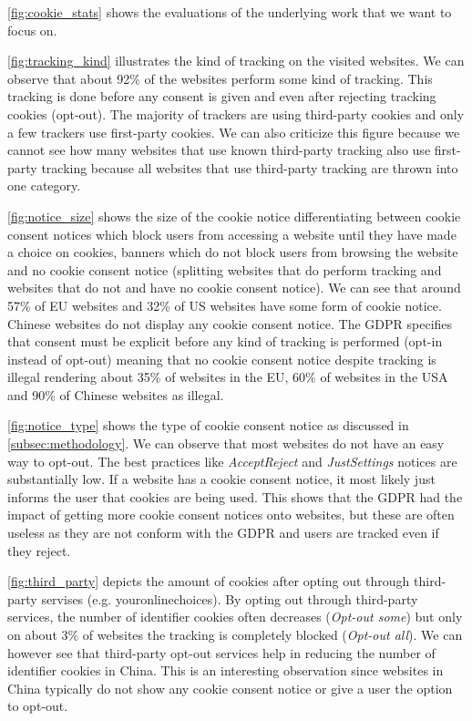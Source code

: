 \autoref{fig:cookie_stats} shows the evaluations of the underlying work that we want to focus on.

\autoref{fig:tracking_kind} illustrates the kind of tracking on the visited websites. We can observe that about 92\% of
the websites perform some kind of tracking. This tracking is done before any consent is given and even after rejecting
tracking cookies (opt-out). The majority of trackers are using third-party cookies and only a few trackers use
first-party cookies.
We can also criticize this figure because we cannot see how many websites that use known third-party tracking also use
first-party tracking because all websites that use third-party tracking are thrown into one category.

\autoref{fig:notice_size} shows the size of the cookie notice differentiating between cookie consent notices which block
users from accessing a website until they have made a choice on cookies, banners which do not block users from browsing the
website and no cookie consent notice (splitting websites that do perform tracking and websites that do not and have no
cookie consent notice).
We can see that around 57\% of EU websites and 32\% of US
websites have some form of cookie notice. Chinese websites do not display any cookie consent notice.
The GDPR specifies that consent must be explicit before any kind of tracking is performed
(opt-in instead of opt-out) meaning that no cookie consent notice despite tracking is illegal rendering about 35\% of
websites in the EU, 60\% of websites in the USA and 90\% of Chinese websites as illegal.

\autoref{fig:notice_type} shows the type of cookie consent notice as discussed in \autoref{subsec:methodology}.
We can observe that most websites do not have an easy way to opt-out. The best practices like \emph{AcceptReject} and
\emph{JustSettings} notices are substantially low. If a website has a cookie consent notice, it
most likely just informs the user that cookies are being used. This shows that the GDPR had the impact of getting more
cookie consent notices onto websites, but these are often useless as they are not conform with the GDPR and users are
tracked even if they reject.

\autoref{fig:third_party} depicts the amount of cookies after opting out through third-party servises (e.g.
youronlinechoices). By opting out through third-party services, the number of identifier cookies often decreases
(\emph{Opt-out some}) but only on about 3\% of websites the tracking is completely blocked (\emph{Opt-out all}). We can
however see that third-party opt-out services help in reducing the number of identifier cookies in China. This is an
interesting observation since websites in China typically do not show any cookie consent notice or give a user the
option to opt-out.

